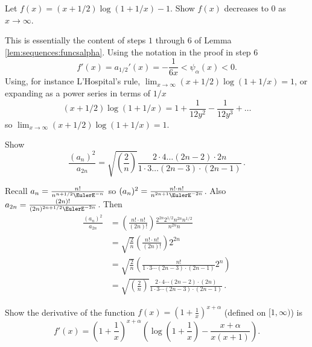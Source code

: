 \documentclass[12pt]{article}
\begin{document}
\begin{exercise}
    Let \( f(x) = (x + 1/2)\log(1 + 1/x) - 1 \).  Show \( f(x) \)
    decreases to \( 0 \) as \( x \to \infty \).
\end{exercise}
\begin{solution}
    This is essentially the content of steps \( 1 \) through \(
    6 \) of Lemma~%
    \ref{lem:sequences:funcsalpha}.  Using the notation in the
    proof in step \( 6 \)
    \[
        f'(x) = a_{1/2}'(x) = - \frac{1}{6x} < \psi_{\alpha}(x)
        < 0.
    \] Using, for instance L'Hospital's rule, \( \lim_{x \to
    \infty}(x + 1/2)\log(1 + 1/x) = 1 \), or expanding as a
    power series in terms of \( 1/x \)
    \[
        (x + 1/2)\log(1 + 1/x) = 1 + \frac{1}{12 y^2} - \frac{1}
        {12 y^3} + \dots
    \] so \( \lim_{x \to \infty}(x + 1/2)\log(1 + 1/x) = 1 \).
\end{solution}
\begin{exercise}
    Show
    \[
        \frac{ \left(a_{n} \right)^2 }{ a_{2n} } = \sqrt{ \left(\frac
        {2}{n} \right) } \frac{ 2 \cdot 4 \dots (2n-2) \cdot 2n
        }{ 1 \cdot 3 \dots (2n-3) \cdot (2n-1) } \,.
    \]
\end{exercise}
\begin{solution}
    Recall \( a_n = \frac{n!} {n^{n+1/2}\EulerE^{-n}} \) so \( (a_n)^2
    = \frac{n!  \cdot n!} {n^{2n+1}\EulerE^{-2n}} \).  Also \( a_
    {2n} = \frac{(2n)!} {(2n)^{2n+1/2}\EulerE^{-2n}} \). Then
    \begin{align*}
        \frac{ \left(a_{n} \right)^2 }{ a_{2n} } &= \left( \frac
        {n! \cdot n!}{(2n)!} \right) \frac{2^{2n} 2^{1/2} n^{2n}
        n^{1/2}}{n^{2n} n} \\
        &= \sqrt{\frac{2}{n}} \left( \frac{n!\cdot n!}{(2n)!}
        \right) 2^{2n} \\
        &= \sqrt{\frac{2}{n}} \left( \frac{n!}{1 \cdot 3 \cdots (2n-3)
        \cdot (2n-1)} 2^{n} \right)\\
        &= \sqrt{\left(\frac{2}{n} \right) } \frac{2 \cdot 4
        \cdots (2n-2) \cdot (2n)}{1 \cdot 3 \cdots (2n-3) \cdot
        (2n-1)} \,.
    \end{align*}
\end{solution}
\begin{exercise}
    Show the derivative of the function \( f(x) = \left( 1 +
    \frac{1}{x} \right) ^{x + \alpha} \) (defined on \( [1,
    \infty) \)) is
    \[
        f'(x) = \left( 1 + \frac{1}{x} \right)^{x + \alpha}
        \left( \log\left( 1 + \frac{1}{x} \right) - \frac{x+\alpha}
        {x(x+1)} \right).
    \]
\end{exercise}
\end{document}
